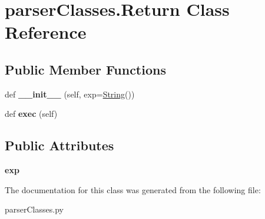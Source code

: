 \hypertarget{classparser_classes_1_1_return}{}\section{parser\+Classes.\+Return Class Reference}
\label{classparser_classes_1_1_return}
\subsection*{Public Member Functions}
\begin{DoxyCompactItemize}
\item 
def {\bfseries \+\_\+\+\_\+init\+\_\+\+\_\+} (self, exp=\hyperlink{classparser_classes_1_1_string}{String}())\hypertarget{classparser_classes_1_1_return_a3034474866e17be4742096ed2434b80d}{}\label{classparser_classes_1_1_return_a3034474866e17be4742096ed2434b80d}

\item 
def {\bfseries exec} (self)\hypertarget{classparser_classes_1_1_return_a0d771079b3f705e980d25c2a4d3c9bd9}{}\label{classparser_classes_1_1_return_a0d771079b3f705e980d25c2a4d3c9bd9}

\end{DoxyCompactItemize}
\subsection*{Public Attributes}
\begin{DoxyCompactItemize}
\item 
{\bfseries exp}\hypertarget{classparser_classes_1_1_return_a2b35e75cdff0a6fbd98f539a679e7848}{}\label{classparser_classes_1_1_return_a2b35e75cdff0a6fbd98f539a679e7848}

\end{DoxyCompactItemize}


The documentation for this class was generated from the following file\+:\begin{DoxyCompactItemize}
\item 
parser\+Classes.\+py\end{DoxyCompactItemize}
